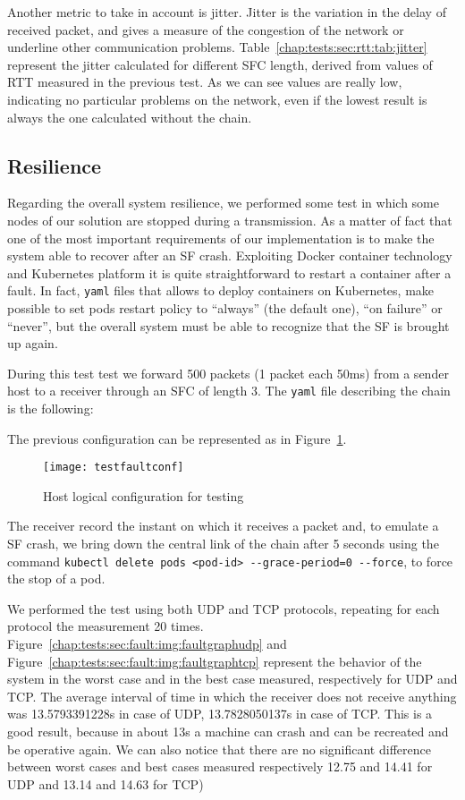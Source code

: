 Another metric to take in account is jitter. Jitter is the variation in the
delay of received packet, and gives a measure of the congestion of the network
or underline other communication problems.
Table~\ref{chap:tests:sec:rtt:tab:jitter} represent the jitter calculated for
different SFC length, derived from values of RTT measured in the previous test.
As we can see values are really low, indicating no particular problems on the
network, even if the lowest result is always the one calculated without the
chain.

\subsection{Resilience}
Regarding the overall system resilience, we performed some test in which some
nodes of our solution are stopped during a transmission. As a matter of fact
that one of the most important requirements of our implementation is to make
the system  able to recover after an SF crash. Exploiting Docker container
technology and Kubernetes platform it is quite straightforward to restart a
container after a fault. In fact, \texttt{yaml} files that allows to deploy
containers on Kubernetes, make possible to set pods restart policy to
``always'' (the default one), ``on failure'' or ``never'', but the overall
system must be able to recognize that the SF is brought up again. 

During this test test we forward 500 packets (1 packet each 50ms) from a sender
host to a receiver through an SFC of length 3. The \texttt{yaml} file
describing the chain is the following:



The previous configuration can be represented as in
Figure~\ref{chap:tests:sec:fault:img:testfaultconf}.
\begin{figure}[H]
  \centering
  \texttt{[image: testfaultconf]}
  \caption{Host logical configuration for testing}
  \label{chap:tests:sec:fault:img:testfaultconf}
\end{figure}

The receiver record the instant on which it receives a packet and, to emulate a
SF crash, we bring down the central link of the chain after 5 seconds using the
command \verb!kubectl delete pods <pod-id> --grace-period=0 --force!, to force
the stop of a pod.

We performed the test using both UDP and TCP protocols, repeating for each
protocol the measurement 20 times.
Figure~\ref{chap:tests:sec:fault:img:faultgraphudp} and
Figure~\ref{chap:tests:sec:fault:img:faultgraphtcp} represent the behavior of
the system in the worst case and in the best case measured, respectively for
UDP and TCP. The average interval of time in which the receiver does not
receive anything was 13.5793391228s in case of UDP, 13.7828050137s in case of
TCP. This is a good result, because in about 13s a machine can crash and can be
recreated and be operative again. We can also notice that there are no
significant difference between worst cases and best cases measured 
respectively 12.75 and 14.41 for UDP and 13.14 and 14.63 for TCP)

